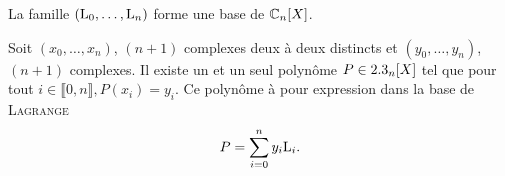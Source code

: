 \begin{prop}
    La famille $(\mathrm{L}_0, \dots, \mathrm{L}_n)$ forme une base de $\mathbb{C}_n[X]$.
\end{prop}

\begin{preuve}

\end{preuve}

\begin{box_titre}[title=Coordonées d'un polynôme dans la base de \textsc{Lagrange}]

Soit $(x_0, \dots, x_n)$, $(n+1)$ complexes deux à deux distincts et $(y_0, \dots, y_n)$, $(n+1)$ complexes. Il existe un et un seul polynôme $P \in 2.3_n[X]$ tel que pour tout $i \in \llbracket 0, n \rrbracket, P(x_i) = y_i$. Ce polynôme à pour expression dans la base de \textsc{Lagrange}
$$P = \sum_{i=0}^n y_i \mathrm{L}_i.$$
\end{box_titre}

\begin{marginfigure}[-5cm]
    
\end{marginfigure}
